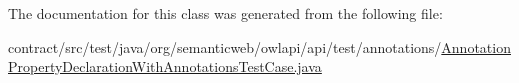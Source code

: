 The documentation for this class was generated from the following file\-:\begin{DoxyCompactItemize}
\item 
contract/src/test/java/org/semanticweb/owlapi/api/test/annotations/\hyperlink{_annotation_property_declaration_with_annotations_test_case_8java}{Annotation\-Property\-Declaration\-With\-Annotations\-Test\-Case.\-java}\end{DoxyCompactItemize}
